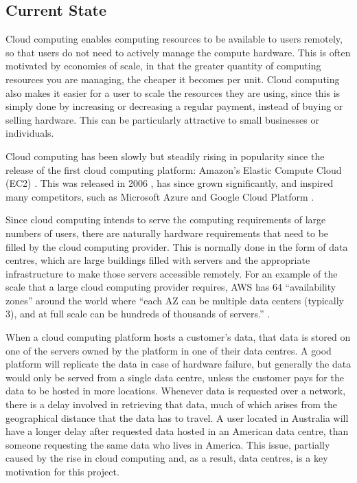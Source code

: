 \subsection{Current State}
\label{current_state}

Cloud computing enables computing resources to be available to users remotely, so that users do not need to actively manage the compute hardware.
This is often motivated by economies of scale, in that the greater quantity of computing resources you are managing, the cheaper it becomes per unit.
Cloud computing also makes it easier for a user to scale the resources they are using, since this is simply done by increasing or decreasing a regular payment, instead of buying or selling hardware. This can be particularly attractive to small businesses or individuals.

Cloud computing has been slowly but steadily rising in popularity since the release of the first cloud computing platform: Amazon's Elastic Compute Cloud (EC2) \cite{ec2}.
This was released in 2006 \cite{announce_ec2}, has since grown significantly, and inspired many competitors, such as Microsoft Azure \cite{azure} and Google Cloud Platform \cite{google_cloud}.

Since cloud computing intends to serve the computing requirements of large numbers of users, there are naturally hardware requirements that need to be filled by the cloud computing provider.
This is normally done in the form of data centres, which are large buildings filled with servers and the appropriate infrastructure to make those servers accessible remotely. For an example of the scale that a large cloud computing provider requires, AWS has 64 ``availability zones'' around the world where ``each AZ can be multiple data centers (typically 3), and at full scale can be hundreds of thousands of servers.'' \cite{aws_infrastructure_blog}.

When a cloud computing platform hosts a customer's data, that data is stored on one of the servers owned by the platform in one of their data centres. A good platform will replicate the data in case of hardware failure, but generally the data would only be served from a single data centre, unless the customer pays for the data to be hosted in more locations.
Whenever data is requested over a network, there is a delay involved in retrieving that data, much of which arises from the geographical distance that the data has to travel. A user located in Australia will have a longer delay after requested data hosted in an American data centre, than someone requesting the same data who lives in America.
This issue, partially caused by the rise in cloud computing and, as a result, data centres, is a key motivation for this project.

